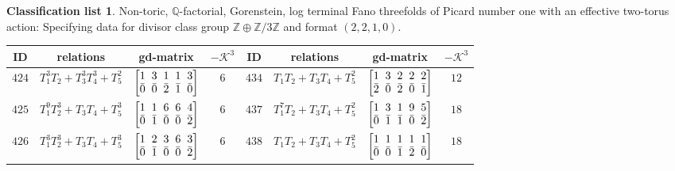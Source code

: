 \documentclass[pdftex]{sigma}%
\theoremstyle{definition}
\newtheorem{class-list}[thm]{Classification list}
\def\ZZ{{\mathbb Z}}
\def\QQ{{\mathbb Q}}
\numberwithin{equation}{section}
\begin{document}
\begin{class-list}\label{class-list(0,3)}
Non-toric, $\QQ$-factorial, Gorenstein, log terminal Fano
threefolds of Picard number one with an effective two-torus action:
Specifying data for divisor class group
$\ZZ\oplus \ZZ/3\ZZ$ and format $(2,2,1,0)$.
\begin{table}[h!]\centering\setlength{\tabcolsep}{3.5pt}
\renewcommand{\arraystretch}{1.15}\small\tabulinesep=1mm
\begin{tabu}{c|c|c|c||c|c|c|c}
\hline
ID&relations&gd-matrix&$-\mathcal{K}^3$&ID&relations&gd-matrix&$-\mathcal{K}^3$
\\
\hline
${424}$&${T_{1}^{3}T_{2}+T_{3}^{3}T_{4}^{3}+T_{5}^{2}}$
&$\arraycolsep=1mm\begin{bmatrix}{1} & {3} & {1} & {1} & {3} \\ {\bar{0}} & {\bar{0}} & {\bar{2}} & {\bar{1}} & {\bar{0}}\end{bmatrix}$&${6}$
&${434}$&${T_{1}T_{2}+T_{3}T_{4}+T_{5}^{2}}$
&$\arraycolsep=1mm\begin{bmatrix}{1} & {3} & {2} & {2} & {2} \\ {\bar{2}} & {\bar{0}} & {\bar{2}} & {\bar{0}} & {\bar{1}}\end{bmatrix}$&${12}$
\\
\hline
${425}$&${T_{1}^{9}T_{2}^{3}+T_{3}T_{4}+T_{5}^{3}}$
&$\arraycolsep=1mm\begin{bmatrix}{1} & {1} & {6} & {6} & {4} \\ {\bar{0}} & {\bar{1}} & {\bar{0}} & {\bar{0}} & {\bar{2}}\end{bmatrix}$&${6}$
&${437}$&${T_{1}^{7}T_{2}+T_{3}T_{4}+T_{5}^{2}}$
&$\arraycolsep=1mm\begin{bmatrix}{1} & {3} & {1} & {9} & {5} \\ {\bar{0}} & {\bar{1}} & {\bar{1}} & {\bar{0}} & {\bar{2}}\end{bmatrix}$&${18}$
\\
\hline
${426}$&${T_{1}^{3}T_{2}^{3}+T_{3}T_{4}+T_{5}^{3}}$
&$\arraycolsep=1mm\begin{bmatrix}{1} & {2} & {3} & {6} & {3} \\ {\bar{0}} & {\bar{1}} & {\bar{0}} & {\bar{0}} & {\bar{2}}\end{bmatrix}$&${6}$
&${438}$&${T_{1}T_{2}+T_{3}T_{4}+T_{5}^{2}}$
&$\arraycolsep=1mm\begin{bmatrix}{1} & {1} & {1} & {1} & {1} \\ {\bar{0}} & {\bar{0}} & {\bar{1}} & {\bar{2}} & {\bar{0}}\end{bmatrix}$&${18}$

\end{tabu}
\end{table}
\end{class-list}
\end{document}
